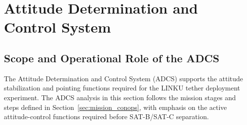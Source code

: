\newpage
\section{Attitude Determination and Control System}
\label{sec:adcs}

\subsection{Scope and Operational Role of the ADCS}
\label{sub:adcs_scope_operational_role}

The Attitude Determination and Control System (ADCS) supports the attitude stabilization and pointing functions required for the LINKU tether deployment experiment. The ADCS analysis in this section follows the mission stages and steps defined in Section~\ref{sec:mission_conops}, with emphasis on the active attitude-control functions required before SAT-B/SAT-C separation.

